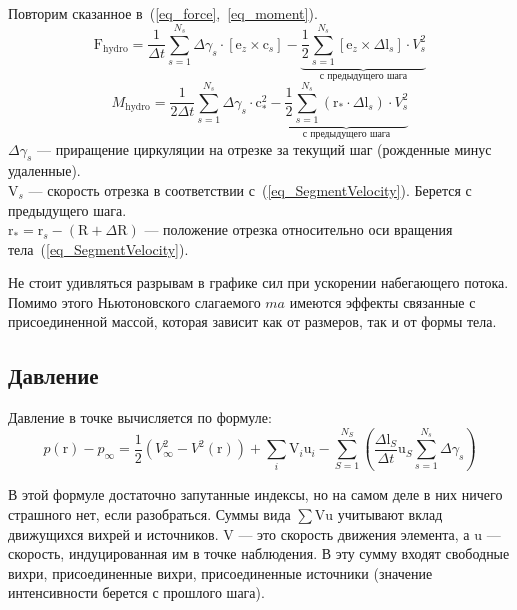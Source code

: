 \documentclass[14pt]{extreport}
\newcommand{\br}[1]{\boldsymbol{\mathrm{#1}}}
\renewcommand{\vec}[1]{\br{#1}}
\begin{document}
Повторим сказанное в~(\ref{eq_force},~\ref{eq_moment}).
\begin{equation}
{\vec F_\text{hydro}} = 
\frac{1}{\Delta t} \sum\limits_{s=1}^{N_s} {\Delta \gamma_s \cdot [\vec e_z \times \vec c_s]} -
\underbrace {
	\frac{1}{2} \sum\limits_{s=1}^{N_s}
		[\vec e_z \times \Delta \vec l_s] \cdot V_s^2
}_{\text{с предыдущего шага}}
\end{equation}
%
\begin{equation}
M_\text{hydro} =
\frac{1}{2\Delta t}\sum\limits_{s=1}^{N_s} { \Delta \gamma_s \cdot \vec c_*^2 }
-
\underbrace {
	\frac{1}{2} \sum\limits_{s=1}^{N_s}
		(\vec r_* \cdot \Delta \vec l_s) \cdot V_s^2
}_{\text{с предыдущего шага}}
\end{equation}
%
$\Delta \gamma_s$ --- приращение циркуляции на отрезке за текущий шаг (рожденные минус удаленные).\\
$\vec V_s$ --- скорость отрезка в соответствии с~(\ref{eq_SegmentVelocity}). Берется с предыдущего шага.\\
$\vec r_* = \vec r_s - (\vec R + \Delta \vec R)$ --- положение отрезка относительно оси вращения тела~(\ref{eq_SegmentVelocity}).

Не стоит удивляться разрывам в графике сил при ускорении набегающего потока. Помимо этого Ньютоновского слагаемого $ma$ имеются эффекты связанные с присоединенной массой, которая зависит как от размеров, так и от формы тела.

\subsection{Давление}
Давление в точке вычисляется по формуле:
\begin{equation}
p(\vec r) - p_\infty =
\frac{1}{2} \left( V^2_\infty - V^2(\vec r) \right) 
+ \sum\limits_i{\vec V_i \vec u_i}
-\sum\limits_{S=1}^{N_S}
{
\left (
	\frac{\Delta \vec l_S}{\Delta t} \vec u_S \sum_{s=1}^{N_s} {\Delta\gamma_s}
\right )
}
\end{equation}

В этой формуле достаточно запутанные индексы, но на самом деле в них ничего страшного нет, если разобраться.
Суммы вида $\sum \vec V \vec u$ учитывают вклад движущихся вихрей и источников. $\vec V$ --- это скорость движения элемента, а $\vec u$ --- скорость, индуцированная им в точке наблюдения.
В эту сумму входят свободные вихри, присоединенные вихри, присоединенные источники (значение интенсивности берется с прошлого шага).
\end{document}
